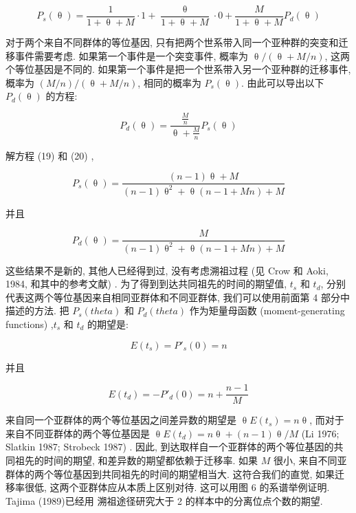 \documentclass[12pt]{article}
\begin{document}
\begin{equation} \label{eq:19}
    P_{s}(\uptheta)=\frac{1}{1+\uptheta +M}\cdot 1+\frac{\uptheta}{1+\uptheta +M}\cdot 0+\frac{M}{1+\uptheta +M}P_{d}(\uptheta)
\end{equation}

对于两个来自不同群体的等位基因, 只有把两个世系带入同一个亚种群的突变和迁移事件需要考虑. 如果第一个事件是一个突变事件,
概率为 $\uptheta /(\uptheta +M/n)$, 这两个等位基因是不同的. 如果第一个事件是把一个世系带入另一个亚种群的迁移事件, 概率为
$(M/n)/(\uptheta +M/n)$, 相同的概率为 $P_{s}(\uptheta)$. 由此可以导出以下 $P_{d}(\uptheta)$ 的方程:

\begin{equation} \label{eq:20}
    P_{d}(\uptheta)=\frac{\frac{M}{n}}{\uptheta +\frac{M}{n}}P_{s}(\uptheta)
\end{equation}

解方程 (19) 和 (20) ,

\begin{equation} \label{eq:21}
    P_{s}(\uptheta)=\frac{(n-1)\uptheta +M}{(n-1)\uptheta ^{2}+\uptheta (n-1+Mn)+M}
\end{equation}

并且

\begin{equation} \label{eq:22}
    P_{d}(\uptheta)=\frac{M}{(n-1)\uptheta ^{2}+\uptheta (n-1+Mn)+M}
\end{equation}

这些结果不是新的, 其他人已经得到过, 没有考虑溯祖过程 (见 Crow 和 Aoki, 1984, 和其中的参考文献) .
为了得到到达共同祖先的时间的期望值, $t_{s}$ 和 $t_{d}$, 分别代表这两个等位基因来自相同亚群体和不同亚群体,
我们可以使用前面第 4 部分中描述的方法. 把 $P_{s}(theta )$ 和 $P_{d}(theta )$ 作为矩量母函数 (moment-generating
functions) ,$t_{s}$ 和 $t_{d}$ 的期望是:

\begin{equation} \label{eq:23}
    E(t_{s}) = P'_{s}(0) = n
\end{equation}

并且

\begin{equation} \label{eq:24}
    E(t_{d}) = -P'_{d}(0) = n + \frac{n-1}{M}
\end{equation}

来自同一个亚群体的两个等位基因之间差异数的期望是 $\uptheta E(t_{s}) = n \uptheta$, 而对于来自不同亚群体的两个等位基因是
$\uptheta E(t_{d}) = n \uptheta +(n-1)\uptheta /M$ (Li 1976; Slatkin 1987; Strobeck 1987) . 因此,
到达取样自一个亚群体的两个等位基因的共同祖先的时间的期望, 和差异数的期望都依赖于迁移率. 如果 $M$ 很小,
来自不同亚群体的两个等位基因到共同祖先的时间的期望相当大. 这符合我们的直觉, 如果迁移率很低, 这两个亚群体应从本质上区别对待.
这可以用图 6 的系谱举例证明. Tajima (1989)已经用 溯祖途径研究大于 2 的样本中的分离位点个数的期望.
\end{document}
